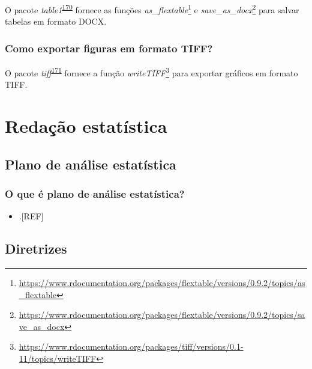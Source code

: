 \documentclass[
]{book}
\providecommand{\tightlist}{%
  \setlength{\itemsep}{0pt}\setlength{\parskip}{0pt}}
\renewcommand{\href}[2]{#2\footnote{\url{#1}}}
\newenvironment{infobox}[1]
  {
  \begin{itemize}
  \renewcommand{\labelitemi}{
    \raisebox{-.7\height}[0pt][0pt]{
      {\setkeys{Gin}{width=3em,keepaspectratio}
        \texttt{[image: \#1]}}
    }
  }
  \setlength{\fboxsep}{1em}
  \begin{blackbox}
  \item
  }
  {
  \end{blackbox}
  \end{itemize}
  }
\begin{document}
\begin{infobox}{images/Rlogo}
O pacote \emph{table1}\textsuperscript{\protect\hyperlink{ref-flextable}{170}} fornece as funções \href{https://www.rdocumentation.org/packages/flextable/versions/0.9.2/topics/as_flextable}{\emph{as\_flextable}} e \href{https://www.rdocumentation.org/packages/flextable/versions/0.9.2/topics/save_as_docx}{\emph{save\_as\_docx}} para salvar tabelas em formato DOCX.

\end{infobox}

\hypertarget{como-exportar-figuras-em-formato-tiff}{%
\subsection{Como exportar figuras em formato TIFF?}\label{como-exportar-figuras-em-formato-tiff}}

\begin{infobox}{images/Rlogo}
O pacote \emph{tiff}\textsuperscript{\protect\hyperlink{ref-tiff}{171}} fornece a função \href{https://www.rdocumentation.org/packages/tiff/versions/0.1-11/topics/writeTIFF}{\emph{writeTIFF}} para exportar gráficos em formato TIFF.

\end{infobox}

\hypertarget{redacao}{%
\chapter{\texorpdfstring{\textbf{Redação estatística}}{Redação estatística}}\label{redacao}}

\hypertarget{plano-analise-estatistica}{%
\section{Plano de análise estatística}\label{plano-analise-estatistica}}

\hypertarget{o-que-uxe9-plano-de-anuxe1lise-estatuxedstica}{%
\subsection{O que é plano de análise estatística?}\label{o-que-uxe9-plano-de-anuxe1lise-estatuxedstica}}

\begin{itemize}
\tightlist
\item
  .{[}REF{]}
\end{itemize}

\hypertarget{diretrizes}{%
\section{Diretrizes}\label{diretrizes}}
\end{document}
